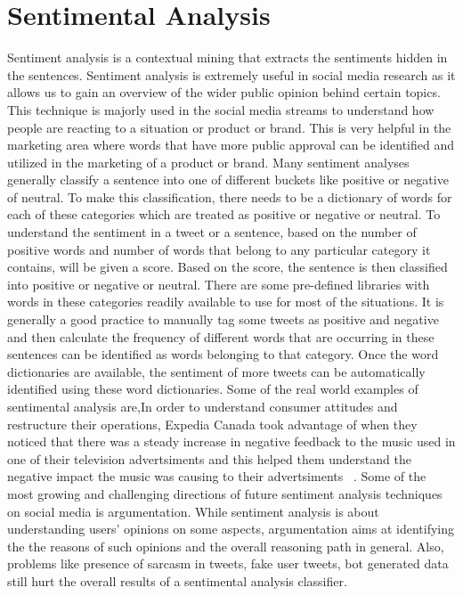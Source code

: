 \section{Sentimental Analysis}
Sentiment analysis is a contextual mining that extracts the sentiments hidden in 
the sentences. Sentiment analysis is extremely useful in social media research as 
it allows us to gain an overview of the wider public opinion behind certain topics.
This technique is majorly used in the social media streams to understand how people 
are reacting to a situation or product or brand. This is very helpful in the 
marketing area where words that have more public approval 
can be identified and utilized in the marketing of a product or brand. Many 
sentiment analyses generally classify a sentence into one of different buckets 
like positive or negative of neutral. To make this classification, there needs 
to be a dictionary of words for each of these categories which are treated as 
positive or negative or neutral. To understand the sentiment in a tweet or a 
sentence, based on the number of positive words and number of words that belong 
to any particular category it contains, will be given a score. Based on the 
score, the sentence is then classified into positive or negative or neutral. 
There are some pre-defined libraries with words in these categories readily 
available to use for most of the situations. It is generally a good practice to 
manually tag some tweets as positive and negative and then calculate the 
frequency of different words that are occurring in these sentences can be 
identified as words belonging to that category. Once the word dictionaries are 
available, the sentiment of more tweets can be automatically identified using 
these word dictionaries. Some of the real world examples of sentimental analysis
 are,In order to understand consumer attitudes and restructure their operations, 
Expedia Canada took advantage of when they noticed that there was a 
steady increase in negative feedback to the music used in one of their 
television advertsiments and this helped them understand the negative impact 
the music was causing to their advertsiments ~\cite{hid-sp18-418-sentimental-analysis-application}. 
Some of the most growing and challenging directions of future sentiment 
analysis techniques on social media is argumentation. While sentiment analysis 
is about understanding users' opinions on some aspects, argumentation aims at 
identifying the the reasons of such opinions and the overall reasoning path in 
general. Also, problems like presence of sarcasm in tweets, fake user tweets, 
bot generated data still hurt the overall results of a sentimental analysis 
classifier. 


